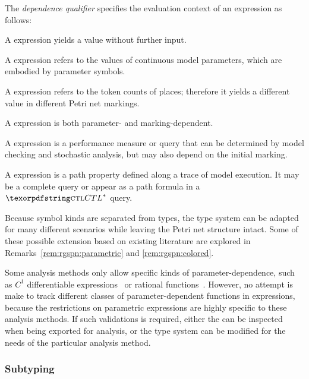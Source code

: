 The \emph{dependence qualifier} specifies the evaluation context of an expression as follows:
\begin{itemize*}
\item A  expression yields a value without further input.
\item A  expression refers to the values of continuous model parameters, which are embodied by parameter symbols.
\item A  expression refers to the token counts of places; therefore it yields a different value in different Petri net markings.
\item A  expression is both parameter- and marking-dependent.
\item A  expression is a performance measure or query that can be determined by model checking and stochastic analysis, but may also depend on the initial marking.
\item A  expression is a path property defined along a trace of model execution. It may be a complete  query or appear as a path formula in a \(\textabbr{CTL}^*\)  query.
\end{itemize*}

Because symbol kinds are separated from types, the type system can be adapted for many different scenarios while leaving the Petri net structure intact. Some of these possible extension based on existing literature are explored in Remarks~\ref{rem:rgspn:parametric} and \ref{rem:rgspn:colored}.

\begin{remark}\label{rem:rgspn:parametric}
  Some analysis methods only allow specific kinds of parameter-dependence, such as \(C^1\) differentiable expressions~\citep{Blake88sensitivity} or rational functions~\citep{Hahn11parametric}. However, no attempt is make to track different classes of parameter-dependent functions in  expressions, because the restrictions on parametric expressions are highly specific to these analysis methods. If such validations is required, either the  can be inspected when being exported for analysis, or the type system can be modified for the needs of the particular analysis method.
\end{remark}

\subsubsection{Subtyping}

